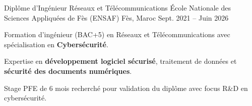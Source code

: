 
\begin{cventries}

    \cventry
    {Diplôme d'Ingénieur Réseaux et Télécommunications} %
    {École Nationale des Sciences Appliquées de Fès (ENSAF)} %
    {Fès, Maroc} %
    {Sept. 2021 – Juin 2026} %
    {
        \begin{cvitems} %
            \item {Formation d'ingénieur (BAC+5) en Réseaux et Télécommunications avec spécialisation en \textbf{Cybersécurité}.}
            \item {Expertise en \textbf{développement logiciel sécurisé}, traitement de données et \textbf{sécurité des documents numériques}.}
            \item {Stage PFE de 6 mois recherché pour validation du diplôme avec focus R\&D en cybersécurité.}
        \end{cvitems}
    }
\end{cventries}